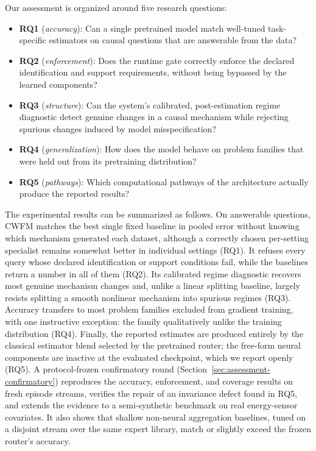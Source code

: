 \documentclass[electronics,article,submit,oneauthor]{Definitions/mdpi}
\begin{document}
Our assessment is organized around five research questions:
\begin{itemize}
\item \textbf{RQ1} (\emph{accuracy}): Can a single pretrained model match well-tuned task-specific estimators on causal questions that are answerable from the data?
\item \textbf{RQ2} (\emph{enforcement}): Does the runtime gate correctly enforce the declared identification and support requirements, without being bypassed by the learned components?
\item \textbf{RQ3} (\emph{structure}): Can the system's calibrated, post-estimation regime diagnostic detect genuine changes in a causal mechanism while rejecting spurious changes induced by model misspecification?
\item \textbf{RQ4} (\emph{generalization}): How does the model behave on problem families that were held out from its pretraining distribution?
\item \textbf{RQ5} (\emph{pathways}): Which computational pathways of the architecture actually produce the reported results?
\end{itemize}

The experimental results can be summarized as follows. On answerable questions, CWFM matches the best single fixed baseline in pooled error without knowing which mechanism generated each dataset, although a correctly chosen per-setting specialist remains somewhat better in individual settings (RQ1). It refuses every query whose declared identification or support conditions fail, while the baselines return a number in all of them (RQ2). Its calibrated regime diagnostic recovers most genuine mechanism changes and, unlike a linear splitting baseline, largely resists splitting a smooth nonlinear mechanism into spurious regimes (RQ3). Accuracy transfers to most problem families excluded from gradient training, with one instructive exception: the family qualitatively unlike the training distribution (RQ4). Finally, the reported estimates are produced entirely by the classical estimator blend selected by the pretrained router; the free-form neural components are inactive at the evaluated checkpoint, which we report openly (RQ5). A protocol-frozen confirmatory round (Section~\ref{sec:assessment-confirmatory}) reproduces the accuracy, enforcement, and coverage results on fresh episode streams, verifies the repair of an invariance defect found in RQ5, and extends the evidence to a semi-synthetic benchmark on real energy-sensor covariates. It also shows that shallow non-neural aggregation baselines, tuned on a disjoint stream over the same expert library, match or slightly exceed the frozen router's accuracy.
\end{document}

